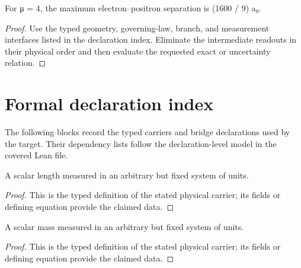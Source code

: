 \begin{theorem}
  \label{thm:physics:IPhO_2026_1_B_1:target}
  For μ = 4, the maximum electron--positron separation is (1600 / 9) a₀.
\end{theorem}
\begin{proof}
  Use the typed geometry, governing-law, branch, and measurement interfaces listed in the declaration index.  Eliminate the intermediate readouts in their physical order and then evaluate the requested exact or uncertainty relation.
\end{proof}
\section*{Formal declaration index}
The following blocks record the typed carriers and bridge declarations used by the target.  Their dependency lists follow the declaration-level model in the covered Lean file.

\begin{definition}
  \label{def:physics:IPhO_2026_1_B_1:aux001}
  A scalar length measured in an arbitrary but fixed system of units.
\end{definition}
\begin{proof}
  This is the typed definition of the stated physical carrier; its fields or defining equation provide the claimed data.
\end{proof}

\begin{definition}
  \label{def:physics:IPhO_2026_1_B_1:aux002}
  A scalar mass measured in an arbitrary but fixed system of units.
\end{definition}
\begin{proof}
  This is the typed definition of the stated physical carrier; its fields or defining equation provide the claimed data.
\end{proof}

